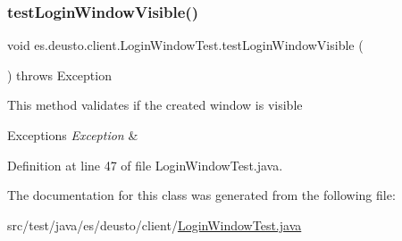 \subsubsection{\texorpdfstring{test\+Login\+Window\+Visible()}{testLoginWindowVisible()}}
{\footnotesize\ttfamily void es.\+deusto.\+client.\+Login\+Window\+Test.\+test\+Login\+Window\+Visible (\begin{DoxyParamCaption}{ }\end{DoxyParamCaption}) throws Exception}

This method validates if the created window is visible 
\begin{DoxyExceptions}{Exceptions}
{\em Exception} & \\
\hline
\end{DoxyExceptions}


Definition at line 47 of file Login\+Window\+Test.\+java.



The documentation for this class was generated from the following file\+:\begin{DoxyCompactItemize}
\item 
src/test/java/es/deusto/client/\hyperlink{_login_window_test_8java}{Login\+Window\+Test.\+java}\end{DoxyCompactItemize}
